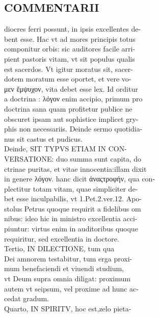\documentclass{article}
\begin{document}
\begin{pages}
\section*{COMMENTARII \\
                }
diocres ferri possunt, in ipsis excellentes de- \\
                bent esse. Hac vt ad mores principis totus \\
                componitur orbis: sic auditores facile arri- \\
                pient pastoris vitam, vt sit populus qualis \\
                est sacerdos. Vt igitur moratus sit, sacer- \\
                dotem moratum esse oportet, et vere vo- \\
                μεν ἔμψυχον, vita debet esse lex. Id orditur \\
                a doctrina : λόγον enim accipio, primum pro \\
                doctrina sana quam profitetur publice ne \\
                obscuret ipsam aut sophistice implicet gry- \\
                phis non necessariis. Deinde sermo quotidia- \\
                nus sit castus et pudicus. \\
                Deinde, SIT TYPVS ETIAM IN CON- \\
                VERSATIONE: duo summa sunt capita, do \\
                ctrinae puritas, et vitae innocentia:illam dixit \\
                in genere λόγον. hanc dicit ἀναςτροφήν, qua con- \\
                plectitur totam vitam, quae simpliciter de- \\
                bet esse inculpabilis, vt 1.Pet.2.ver.12. Apo- \\
                stolus Petrus quoque requirit a fidelibus om \\
                nibus: ideo hic in ministro excellentia acci- \\
                piuntur: virtus enim in auditoribus quoque \\
                requiritur, sed excellentia in doctore. \\
                Tertio, IN DILECTIONE, tum qua \\
                Dei amnorem testabitur, tum erga proxi- \\
                mum benefaciendi et viuendi studium, \\
                vt Deum supra omnia diligat: proximum \\
                autem vt seipsum, vel proxime ad hunc ac- \\
                cedat gradum. \\
                Quarto, IN SPIRITV, hoc est,zelo pieta- \\
                

\end{pages}
\end{document}
